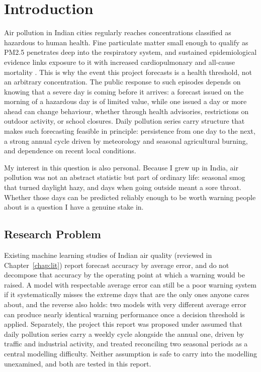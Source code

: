 \documentclass[12pt,a4paper]{report}
\begin{document}
\tableofcontents
\listoffigures
\listoftables

\clearpage
{}
\setcounter{page}{1}

\chapter{Introduction}
\label{chap:intro}

Air pollution in Indian cities regularly reaches concentrations classified as
hazardous to human health. Fine particulate matter small enough to qualify as
PM2.5 penetrates deep into the respiratory system, and sustained
epidemiological evidence links exposure to it with increased cardiopulmonary
and all-cause mortality \citep{pope2006health,chen2020mortality}. This is why
the event this project forecasts is a health threshold, not an arbitrary
concentration. The public response to such episodes depends on knowing that a
severe day is coming before it arrives: a forecast issued on the morning of a
hazardous day is of limited value, while one issued a day or more ahead can
change behaviour, whether through health advisories, restrictions on outdoor
activity, or school closures. Daily pollution series carry structure that makes
such forecasting feasible in principle: persistence from one day to the next, a
strong annual cycle driven by meteorology and seasonal agricultural burning,
and dependence on recent local conditions.

My interest in this question is also personal. Because I grew up in India, air
pollution was not an abstract statistic but part of ordinary life: seasonal
smog that turned daylight hazy, and days when going outside meant a sore
throat. Whether those days can be predicted reliably enough to be worth
warning people about is a question I have a genuine stake in.

\section{Research Problem}

Existing machine learning studies of Indian air quality (reviewed in
Chapter~\ref{chap:lit}) report forecast accuracy by average error, and do not
decompose that accuracy by the operating point at which a warning would be
raised. A model with respectable average error can still be a poor warning
system if it systematically misses the extreme days that are the only ones
anyone cares about, and the reverse also holds: two models with very different
average error can produce nearly identical warning performance once a decision
threshold is applied. Separately, the project this report was proposed under
assumed that daily pollution series carry a weekly cycle alongside the annual
one, driven by traffic and industrial activity, and treated reconciling two
seasonal periods as a central modelling difficulty. Neither assumption is safe
to carry into the modelling unexamined, and both are tested in this report.
\end{document}
